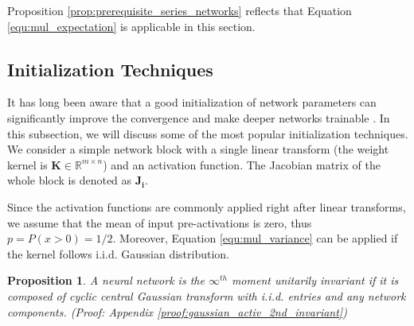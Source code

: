 \documentclass[10pt,journal,compsoc]{IEEEtran}
\newtheorem{prop}{Proposition}[section]
\begin{document}
Proposition \ref{prop:prerequisite_series_networks} reflects that Equation \eqref{equ:mul_expectation} is applicable in this section.

\subsection{Initialization Techniques}\label{sec:initialization_serial}

It has long been aware that a good initialization of network parameters can significantly improve the convergence and make deeper networks trainable \cite{mishkin2015all,he2015delving,xiao2018dynamical}. In this subsection, we will discuss some of the most popular initialization techniques. We consider a simple network block with a single linear transform (the weight kernel is $\mathbf{K}\in \mathbb{R}^{m\times n}$) and an activation function. The Jacobian matrix of the whole block is denoted as $\mathbf{J_i}$.

Since the activation functions are commonly applied right after linear transforms, we assume that the mean of input pre-activations is zero, thus $p=P(x>0)=1/2$. Moreover, Equation \eqref{equ:mul_variance} can be applied if the kernel follows i.i.d. Gaussian distribution.
\begin{prop}
A neural network is the $\infty^{th}$ moment unitarily invariant if it is composed of cyclic central Gaussian transform with i.i.d. entries and any network components. (Proof: Appendix \ref{proof:gaussian_activ_2nd_invariant})
\label{prop:gaussian_activ_2nd_invariant}
\end{prop}
\end{document}
